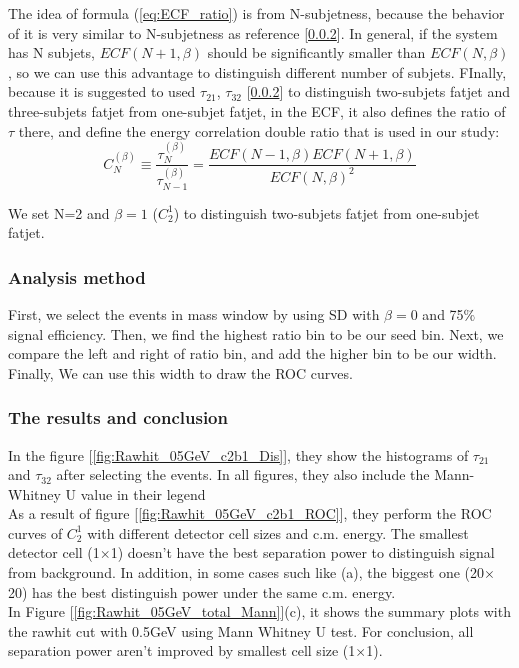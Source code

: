 The idea of formula (\ref{eq:ECF_ratio}) is from N-subjetness, because the behavior of it is very similar to N-subjetness as reference [\ref{}]. In general, if the system has N subjets, $ECF(N+1,\beta)$ should be significantly smaller than $ECF(N,\beta)$, so we can use this advantage to distinguish different number of subjets. FInally, because it is suggested to used $\tau_{21}$, $\tau_{32}$ [\ref{}] to distinguish two-subjets fatjet and three-subjets fatjet from one-subjet fatjet, in the ECF, it also defines the ratio of $\tau$ there, and define the energy correlation double ratio that is used in our study:\\
\begin{equation}
C_{N}^{(\beta)}\equiv\frac{\tau_{N}^{(\beta)}}{\tau_{N-1}^{(\beta)}}=\frac{ECF(N-1,\beta)ECF(N+1,\beta)}{ECF(N,\beta)^2}
\end{equation}

We set N=2 and $\beta=1$ ($C_{2}^{1}$) to distinguish two-subjets fatjet from one-subjet fatjet.
\subsubsection{Analysis method}
First, we select the events in mass window by using SD with $\beta=0$ and 75$\%$ signal efficiency. Then, we find the highest ratio bin to be our seed bin. Next, we compare the left and right of ratio bin, and add the higher bin to be our width. Finally,  We can use this width to draw the ROC curves.\\
\subsubsection{The results and conclusion}
In the figure [\ref{fig:Rawhit_05GeV_c2b1_Dis}], they show the histograms of $\tau_{21}$ and $\tau_{32}$ after selecting the events. In all figures, they also include the Mann-Whitney U value in their legend\\

As a result of figure [\ref{fig:Rawhit_05GeV_c2b1_ROC}], they perform the ROC curves of $C_{2}^{1}$ with different detector cell sizes and c.m. energy. The smallest detector cell (1$\times$1) doesn't have the best separation power to distinguish signal from background. In addition, in some cases such like (a), the biggest one (20$\times$20) has the best distinguish power under the same c.m. energy.\\

In Figure [\ref{fig:Rawhit_05GeV_total_Mann}](c), it shows the summary plots with the rawhit cut with 0.5GeV using Mann Whitney U test. For conclusion, all separation power aren't improved by smallest cell size (1$\times$1).\\

